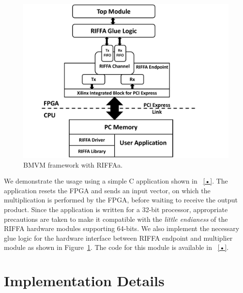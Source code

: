 \documentclass[conference, 9pt]{IEEEtran}
\begin{document}
\begin{figure}[t!]
\centering
\includegraphics[scale=0.20]{figs/riffa.pdf}
\caption{BMVM framework with RIFFAa.}
\label{fig:riffa}
\end{figure}

We demonstrate the usage using a simple C application shown in ~\ref{•}. The application resets the FPGA and sends an input vector, on which the multiplication is performed by the FPGA, before waiting to receive the output product. Since the application is written for a 32-bit processor, appropriate precautions are taken to make it compatible with the \emph{little endianess} of the RIFFA hardware modules supporting 64-bits. We also implement the necessary glue logic for the hardware interface between RIFFA endpoint and multiplier module as shown in Figure~\ref{fig:riffa}. The code for this module is available in ~\ref{•}.\\  
      
\section{Implementation Details}~\label{sec:Impl}

%
%
\end{document}

